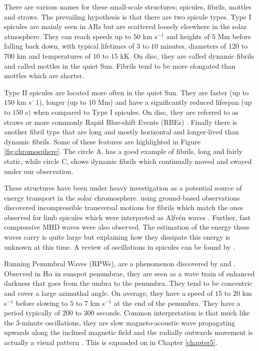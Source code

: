     There are various names for these small-scale structures; spicules, fibrils, mottles and straws.
    The prevailing hypothesis is that there are two spicule types.
    Type I spicules are mainly seen in ARs but are scattered loosely elsewhere in the solar atmosphere.
    They can reach speeds up to $50$ km s$^{-1}$ and heights of $5$ Mm before falling back down, with typical lifetimes of $3$ to $10$ minutes, diameters of $120$ to $700$ km and temperatures of $10$ to $15$ kK.
    On disc, they are called dynamic fibrils and called mottles in the quiet Sun.
    Fibrils tend to be more elongated than mottles which are shorter.
    
    Type II spicules are located more often in the quiet Sun.
    They are faster (up to $150$ km s$^-1$), longer (up to $10$ Mm) and have a significantly reduced lifespan (up to $150$ s) when compared to Type I spicules.
    On disc, they are referred to as straws or more commonly Rapid Blue-shift Events (RBEs) \citep{Zaqarashvili2009}.
    Finally there is another fibril type that are long and mostly horizontal and longer-lived than dynamic fibrils.
    Some of these features are highlighted in Figure \ref{fig:chromosphere}.
    The circle A, has a good example of fibrils, long and fairly static, while circle C, shows dynamic fibrils which continually moved and swayed under our observation.
    
    These structures have been under heavy investigation as a potential source of energy transport in the solar chromosphere.
    \cite{Morton2012} using ground-based observations discovered incompressible transversal motions for fibrils which match the ones observed for limb spicules which were interpreted as Alfv\'en waves \citep{DePontieu2007}.
    Further, fast compressive MHD waves were also observed.
    The estimation of the energy these waves carry is quite large but explaining how they dissipate this energy is unknown at this time.
    A review of oscillations in spicules can be found by \cite{Zaqarashvili2009}. 
      
    Running Penumbral Waves (RPWs), are a phenomenon discovered by \cite{Zirin1972} and \cite{Giovanelli1972}. 
    Observed in H$\alpha$ in sunspot penumbrae, they are seen as a wave train of enhanced darkness that goes from the umbra to the penumbra.
    They tend to be concentric and cover a large azimuthal angle.
    On average, they have a speed of $15$ to $20$ km s$^{-1}$ before slowing to $5$ to $7$ km s$^{-1}$ at the end of the penumbra.
    They have a period typically of $200$ to $300$ seconds. 
    Common interpretation is that much like the $3$-minute oscillations, they are slow magneto-acoustic wave propagating upwards along the inclined magnetic field and the radially outwards movement is actually a visual pattern \citep{UTMO,ORWS,OASO}.
    This is expanded on in Chapter \ref{chapter5}.
    
